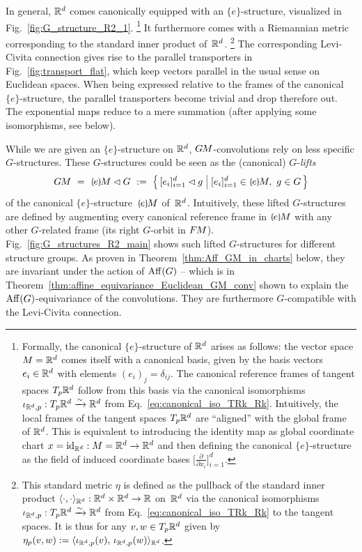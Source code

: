 In general, $\mathbb{R}^d$ comes canonically equipped with an $\{e\}$-structure, visualized in Fig.~\ref{fig:G_structure_R2_1}.%
\footnote{
    Formally, the canonical $\{e\}$-structure of $\mathbb{R}^d$ arises as follows:
    the vector space $M=\mathbb{R}^d$ comes itself with a canonical basis, given by the basis vectors $e_i \in \mathbb{R}^d$ with elements $(e_i)_j = \delta_{ij}$.
    The canonical reference frames of tangent spaces $T_p\mathbb{R}^d$ follow from this basis via the canonical isomorphisms
    $\iota_{\mathbb{R}^d,p}: T_p{\mathbb{R}^d} \xrightarrow{\sim} \mathbb{R}^d$ from Eq.~\eqref{eq:canonical_iso_TRk_Rk}.
    Intuitively, the local frames of the tangent spaces $T_p\mathbb{R}^d$ are ``aligned'' with the global frame of $\mathbb{R}^d$.
    This is equivalent to introducing the identity map as global coordinate chart $x = \mathrm{id}_{\mathbb{R}^d} : M=\mathbb{R}^d \to \mathbb{R}^d$ and then defining the canonical $\{e\}$-structure as the field of induced coordinate bases $\big[\frac{\partial}{\partial x_i} \big]_{i=1}^d$.
}
It furthermore comes with a Riemannian metric corresponding to the standard inner product of~$\mathbb{R}^d$.%
\footnote{
    This standard metric $\eta$ is defined as the pullback of the standard inner product
    $\langle\cdot,\cdot\rangle_{\mathbb{R}^d}: \mathbb{R}^d\times\mathbb{R}^d \to \mathbb{R}$
    on~$\mathbb{R}^d$ via the canonical isomorphisms
    $\iota_{\mathbb{R}^d,p}: T_p{\mathbb{R}^d} \xrightarrow{\sim} \mathbb{R}^d$ from Eq.~\eqref{eq:canonical_iso_TRk_Rk}
    to the tangent spaces.
    It is thus for any $v,w\in T_p\mathbb{R}^d$ given by
    ${\eta_p(v,w) := \langle \iota_{\mathbb{R}^d,p}(v) ,\, \iota_{\mathbb{R}^d,p}(w) \rangle_{\mathbb{R}^d}}$.
}
The corresponding Levi-Civita connection gives rise to the parallel transporters in Fig.~\ref{fig:transport_flat}, which keep vectors parallel in the usual sense on Euclidean spaces.
When being expressed relative to the frames of the canonical $\{e\}$-structure, the parallel transporters become trivial and drop therefore out.
The exponential maps reduce to a mere summation (after applying some isomorphisms, see below).


While we are given an $\{e\}$-structure on $\mathbb{R}^d$, $G\mkern-1.4muM$-convolutions rely on less specific $G$-structures.
These $G$-structures could be seen as the (canonical) $G$-\emph{lifts}
\begin{align}\label{eq:G_lifted_G_structure_Rd}
    \GM\ =\ \eM\lhd G\ :=\ \pig\{\, [e_i]_{i=1}^d \lhd g \;\pig|\; [e_i]_{i=1}^d \in \eM,\ g\in G \,\pig\}
\end{align}
of the canonical $\{e\}$-structure~$\eM$ of~$\mathbb{R}^d$.
Intuitively, these lifted $G$-structures are defined by augmenting every canonical reference frame in $\eM$ with any other $G$-related frame (its right $G$-orbit in $F\mkern-1.5muM$).
Fig.~\ref{fig:G_structures_R2_main} shows such lifted $G$-structures for different structure groups.
As proven in Theorem~\ref{thm:Aff_GM_in_charts} below, they are invariant under the action of $\operatorname{Aff}(G)$ -- which is in Theorem~\ref{thm:affine_equivariance_Euclidean_GM_conv} shown to explain the $\operatorname{Aff}(G)$-equivariance of the convolutions.
They are furthermore $G$-compatible with the Levi-Civita connection.


